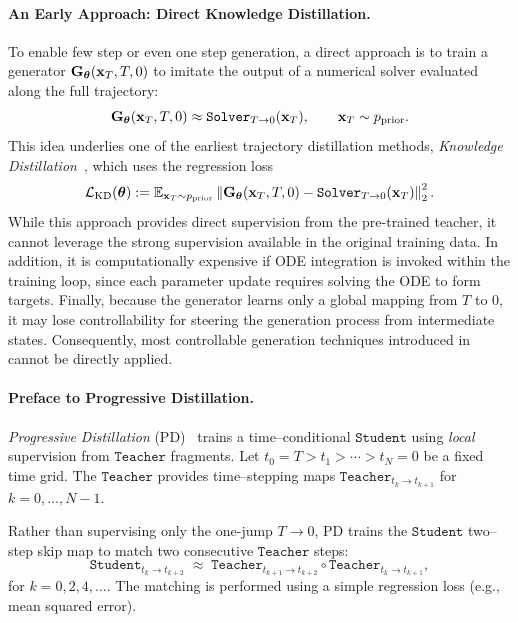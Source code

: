 \paragraph{An Early Approach: Direct Knowledge Distillation.}
To enable few step or even one step generation, a direct approach is to train a generator ${\mathbf{G}}_{\bm{\theta}}({\mathbf{x}}_T, T,0)$ to imitate the output of a numerical solver evaluated along the full trajectory:
\[
{\mathbf{G}}_{\bm{\theta}}({\mathbf{x}}_T, T,0)\approx \mathtt{Solver}_{T\to 0}({\mathbf{x}}_T), 
\qquad {\mathbf{x}}_T \sim p_{\mathrm{prior}}.
\]
This idea underlies one of the earliest trajectory distillation methods, \emph{Knowledge Distillation}~\citep{luhman2021knowledge}, which uses the regression loss
\[
\mathcal{L}_{\mathrm{KD}}({\bm{\theta}})
:= 
\mathbb{E}_{{\mathbf{x}}_T \sim p_{\mathrm{prior}}}
\left\|
{\mathbf{G}}_{\bm{\theta}}({\mathbf{x}}_T, T,0)
-
\mathtt{Solver}_{T\to 0}({\mathbf{x}}_T)
\right\|_2^2.
\]
While this approach provides direct supervision from the pre-trained teacher,
it cannot leverage the strong supervision available in the original training data.
In addition, it is computationally expensive if ODE integration is invoked within
the training loop, since each parameter update requires solving the ODE to form
targets. Finally, because the generator learns only a global mapping from $T$ to $0$, it may lose controllability for steering the generation process from intermediate states. Consequently, most controllable generation techniques introduced in  cannot be directly applied.




\paragraph{Preface to Progressive Distillation.}
\emph{Progressive Distillation} (PD)~\citep{salimans2021progressive} trains a time–conditional $ \mathtt{Student} $ using \emph{local} supervision from $\mathtt{Teacher}$ fragments. 
Let $t_0=T>t_1>\cdots>t_N=0$ be a fixed time grid. 
The $ \mathtt{Teacher} $ provides time–stepping maps $\mathtt{Teacher}_{t_k\to t_{k+1}}$ for $k=0,\ldots,N-1$.


Rather than supervising only the one-jump $T\to 0$, PD trains the $ \mathtt{Student}  $ two–step skip map to match two consecutive $ \mathtt{Teacher}$ steps:
\[
\mathtt{Student}_{t_k\to t_{k+2}}
\;\approx\;
\mathtt{Teacher}_{t_{k+1}\to t_{k+2}}
\circ
\mathtt{Teacher}_{t_{k}\to t_{k+1}},
\]
for $k = 0, 2, 4, \dots$.
The matching is performed using a simple regression loss (e.g., mean squared error).


